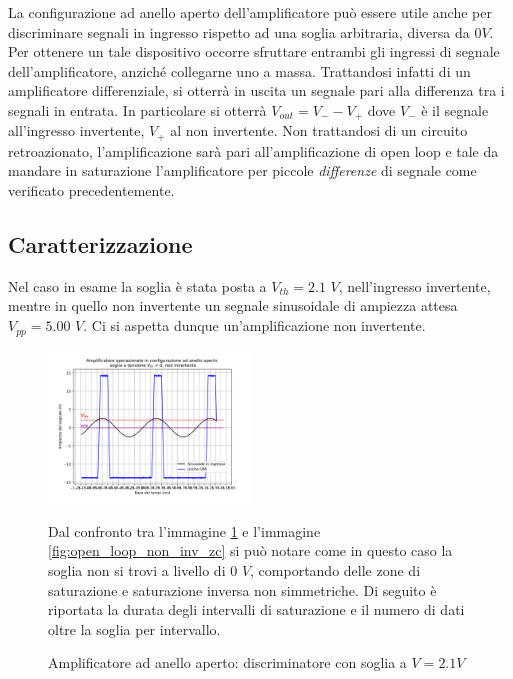\documentclass[journal]{IEEEtran}
\begin{document}
La configurazione ad anello aperto dell'amplificatore può essere utile anche per discriminare segnali in ingresso rispetto ad una soglia arbitraria, diversa da $0V$.
Per ottenere un tale dispositivo occorre sfruttare entrambi gli ingressi di segnale dell'amplificatore, anziché collegarne uno a massa. Trattandosi infatti di un amplificatore differenziale, si otterrà in
uscita un segnale pari alla differenza tra i segnali in entrata. In particolare si otterrà $V_{out} = V_{-} - V_{+}$ dove $V_{-}$ è il segnale all'ingresso invertente, $V_{+
}$ al non invertente.
Non trattandosi di un circuito retroazionato, l'amplificazione sarà pari all'amplificazione di open loop e tale da mandare in saturazione l'amplificatore per piccole
\textit{differenze} di segnale come verificato precedentemente.
\subsection{\textbf{Caratterizzazione}}
Nel caso in esame la soglia è stata posta a $V_{th} = 2.1$ $V$, nell'ingresso invertente, mentre in quello non invertente un segnale sinusoidale di ampiezza attesa $V_{pp} = 5.00$ $V$. Ci si aspetta dunque un'amplificazione non invertente.

\begin{figure}[H]%
\begin {center}
\includegraphics[width=0.48\textwidth]{analysis/output/OPA-open-loop-biased_threshold.pdf}
\caption{Amplificatore ad anello aperto: discriminatore con soglia a $V = 2.1 V$}
\label{fig:biased_cross}
\end {center}



Dal confronto tra l'immagine \ref{fig:biased_cross} e l'immagine \ref{fig:open_loop_non_inv_zc} si può notare come in questo caso la soglia non si trovi a livello di $0$ $V$, comportando delle zone di saturazione e
saturazione inversa non simmetriche. Di seguito è riportata la durata degli intervalli di saturazione e il numero di dati oltre la soglia per intervallo.
\end{figure}
\end{document}
